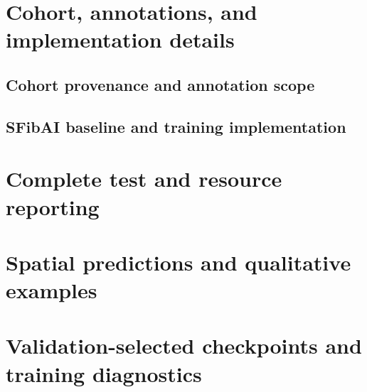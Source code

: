 \appendix
\setcounter{table}{0}
\setcounter{figure}{0}
\setcounter{equation}{0}
\renewcommand{\thetable}{S\arabic{table}}
\renewcommand{\thefigure}{S\arabic{figure}}
\renewcommand{\theequation}{S\arabic{equation}}
\renewcommand{\theHtable}{appendix.\arabic{table}}
\renewcommand{\theHfigure}{appendix.\arabic{figure}}
\renewcommand{\theHequation}{appendix.\arabic{equation}}

\section{Cohort, annotations, and implementation details}\label{sec:appendix-implementation}
\subsection{Cohort provenance and annotation scope}\label{sec:appendix-cohort}

\subsection{SFibAI baseline and training implementation}

\FloatBarrier
\section{Complete test and resource reporting}\label{sec:appendix-results}


\FloatBarrier
\section{Spatial predictions and qualitative examples}\label{sec:appendix-analyses}

\FloatBarrier
\section{Validation-selected checkpoints and training diagnostics}\label{sec:appendix-selection}

